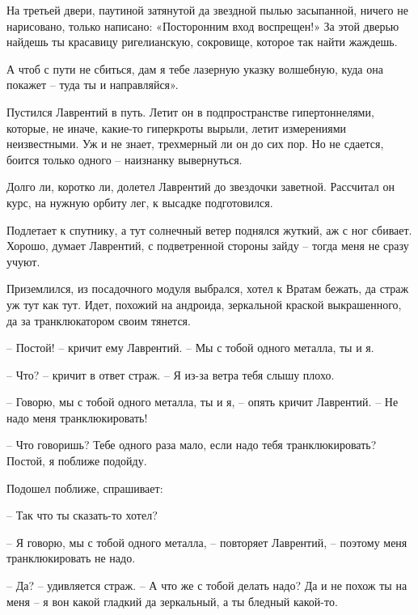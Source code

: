 \documentclass[ebook,oneside,final,openright]{memoir}
\begin{document}
\par
На третьей двери, паутиной затянутой да звездной пылью засыпанной, ничего не нарисовано, только написано: «Посторонним вход воспрещен!» За этой дверью найдешь ты красавицу ригелианскую, сокровище, которое так найти жаждешь.\par
\par
А чтоб с пути не сбиться, дам я тебе лазерную указку волшебную, куда она покажет – туда ты и направляйся».\par
\par
Пустился Лаврентий в путь. Летит он в подпространстве гипертоннелями, которые, не иначе, какие-то гиперкроты вырыли, летит измерениями неизвестными. Уж и не знает, трехмерный ли он до сих пор. Но не сдается, боится только одного – наизнанку вывернуться.\par
\par
Долго ли, коротко ли, долетел Лаврентий до звездочки заветной. Рассчитал он курс, на нужную орбиту лег, к высадке подготовился.\par
\par
Подлетает к спутнику, а тут солнечный ветер поднялся жуткий, аж с ног сбивает. Хорошо, думает Лаврентий, с подветренной стороны зайду – тогда меня не сразу учуют. \par
\par
 Приземлился, из посадочного модуля выбрался, хотел к Вратам бежать, да страж уж тут как тут. Идет, похожий на андроида, зеркальной краской выкрашенного, да за транклюкатором своим тянется. \par
 \par
– Постой! – кричит ему Лаврентий. – Мы с тобой одного металла, ты и я. \par
– Что? – кричит в ответ страж. – Я из-за ветра тебя слышу плохо. \par
– Говорю, мы с тобой одного металла, ты и я, – опять кричит Лаврентий. – Не надо меня транклюкировать!\par
– Что говоришь? Тебе одного раза мало, если надо тебя транклюкировать? Постой, я поближе подойду. \par
Подошел поближе, спрашивает: \par
– Так что ты сказать-то хотел? \par
– Я говорю, мы с тобой одного металла, – повторяет Лаврентий, – поэтому меня транклюкировать не надо. \par
– Да? – удивляется страж. – А что же с тобой делать надо? Да и не похож ты на меня – я вон какой гладкий да зеркальный, а ты бледный какой-то. \par
\end{document}
